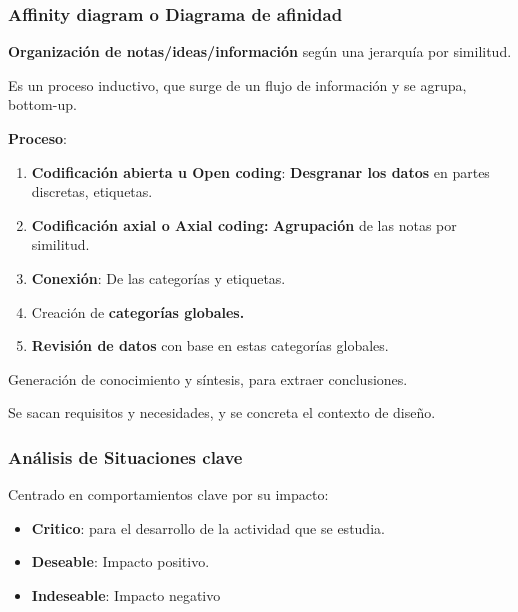 \documentclass[12pt]{report} %
\begin{document}
\hypertarget{affinity-diagram-o-diagrama-de-afinidad}{%
\subsubsection{Affinity diagram o Diagrama de
afinidad}\label{affinity-diagram-o-diagrama-de-afinidad}}

\textbf{Organización de notas/ideas/información} según una jerarquía por
similitud.

Es un proceso inductivo, que surge de un flujo de información y se
agrupa, bottom-up.

\textbf{Proceso}:

\begin{enumerate}
\def\labelenumi{\arabic{enumi}.}

\item
  \textbf{Codificación abierta u Open coding}: \textbf{Desgranar los
  datos} en partes discretas, etiquetas.
\item
  \textbf{Codificación axial o Axial coding:} \textbf{Agrupación} de las
  notas por similitud.
\item
  \textbf{Conexión}: De las categorías y etiquetas.
\item
  Creación de \textbf{categorías globales.}
\item
  \textbf{Revisión de datos} con base en estas categorías globales.
\end{enumerate}

Generación de conocimiento y síntesis, para extraer conclusiones.

Se sacan requisitos y necesidades, y se concreta el contexto de diseño.

\hypertarget{anuxe1lisis-de-situaciones-clave}{%
\subsubsection{Análisis de Situaciones
clave}\label{anuxe1lisis-de-situaciones-clave}}

Centrado en comportamientos clave por su impacto:

\begin{itemize}

\item
  \textbf{Critico}: para el desarrollo de la actividad que se estudia.
\item
  \textbf{Deseable}: Impacto positivo.
\item
  \textbf{Indeseable}: Impacto negativo
\end{itemize}
\end{document}
